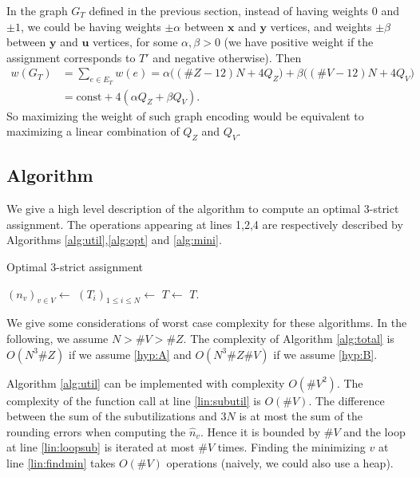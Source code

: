 \documentclass[]{article}
\begin{document}
In the graph $G_T$ defined in the previous section, instead of having weights $0$ and $\pm 1$, we could be having weights $\pm\alpha$ between $\mathbf{x}$ and  $\mathbf{y}$ vertices, and weights $\pm\beta$ between $\mathbf{y}$ and  $\mathbf{u}$ vertices, for some $\alpha,\beta>0$ (we have positive weight if the assignment corresponds to $T'$ and negative otherwise). Then
\begin{align*}
	w(G_T) &= \sum_{e\in E_T} w(e) = 
	\alpha \big( (\#Z-12)N + 4 Q_Z\big) + 
	\beta \big( (\#V-12)N + 4 Q_V\big) \\
	&= \mathrm{const}+ 4(\alpha Q_Z + \beta Q_V).
\end{align*}
So maximizing the weight of such graph encoding would be equivalent to maximizing a linear combination of $Q_Z$ and $Q_V$.


\subsection{Algorithm}
We give a high level description of the algorithm to compute an optimal 3-strict assignment. The operations appearing at lines 1,2,4 are respectively described by Algorithms \ref{alg:util},\ref{alg:opt} and \ref{alg:mini}.



\begin{algorithm}[H]
	\caption{Optimal 3-strict assignment}
	\label{alg:total}
	\begin{algorithmic}[1]
		\State $(n_v)_{v\in V} \leftarrow$ 
		\State $(T_i)_{1\le i\le N} \leftarrow$ 
			\State $T \leftarrow$ 
		\EndIf
		\State \Return $T$.
	\EndFunction
	\end{algorithmic}
\end{algorithm}

We give some considerations of worst case complexity for these algorithms. In the following, we assume $N>\#V>\#Z$. The complexity of Algorithm \ref{alg:total} is $O(N^3\# Z)$ if we assume \eqref{hyp:A} and $O(N^3 \#Z \#V)$ if we assume \eqref{hyp:B}.

Algorithm \ref{alg:util} can be implemented with complexity $O(\#V^2)$. The complexity of the function call at line \ref{lin:subutil} is $O(\#V)$. The difference between the sum of the subutilizations and $3N$ is at most the sum of the rounding errors when computing the $\hat{n}_v$. Hence it is bounded by $\#V$ and the loop at line \ref{lin:loopsub} is iterated at most $\#V$ times. Finding the minimizing $v$ at line \ref{lin:findmin} takes $O(\#V)$ operations (naively, we could also use a heap).
\end{document}
